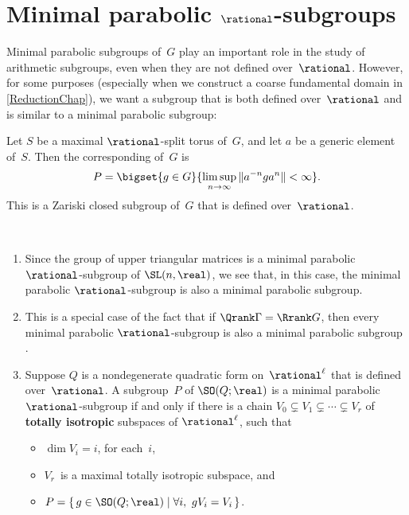 \section{Minimal parabolic \texorpdfstring{$\rational$}{Q}-subgroups}


Minimal parabolic subgroups of~$G$ play an important role in the study of arithmetic subgroups, even when they are not defined over~$\rational$. However, for some purposes (especially when we construct a coarse fundamental domain in \cref{ReductionChap}), we want a subgroup that is both defined over~$\rational$ and is similar to a minimal parabolic subgroup:

\begin{defn}
Let $S$ be a maximal $\rational$-split torus of~$G$, and let $a$ be a generic element of~$S$. Then the corresponding  %
of~$G$ is
	$$P = \bigset{ g \in G }{ \limsup_{n \to \infty} \| a^{-n} g a^n \| < \infty } .$$
This is a Zariski closed subgroup of~$G$ that is defined over~$\rational$.
 \end{defn}

\begin{egs} \ \label{QParabEgs}
 \noprelistbreak
 \begin{enumerate}

	\item \label{QParabEgs-SLn}
	Since the group of upper triangular matrices is a minimal parabolic $\rational$-subgroup of $\SL(n,\real)$, we see that, in this case, the minimal parabolic $\rational$-subgroup is also a minimal parabolic subgroup. 
	
	\item This is a special case of the fact that if $\Qrank \Gamma = \Rrank G$, then every minimal parabolic $\rational$-subgroup is also a minimal parabolic subgroup . 
	
	 \item \label{QParabEgs-SOQ}
	 Suppose $Q$ is a nondegenerate quadratic form on~$\rational^\ell$ that is defined over~$\rational$. A subgroup~$P$ of $\SO(Q; \real)$ is a minimal parabolic $\rational$-subgroup if and only if there is a chain $V_0 \subsetneq V_1 \subsetneq \cdots \subsetneq V_r$ of \textbf{totally isotropic} subspaces of $\rational^\ell$, such that 
	 	\begin{itemize}
		\item $\dim V_i = i$, for each~$i$,
		\item $V_r$~is a maximal totally isotropic subspace, 
		and
		\item $ P = \{\, g \in \SO(Q; \real) \mid \forall i, \ g V_i = V_i \,\} $.
		\end{itemize}
	 \end{enumerate}
 \end{egs}

